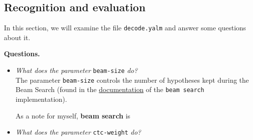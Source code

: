 \documentclass[a4paper]{article}
\def\inline{\lstinline[basicstyle=\ttfamily,keywordstyle={}]}
\begin{document}
\subsection{Recognition and evaluation}

In this section, we will examine the file \inline{decode.yalm} and answer some questions about it.

\textbf{Questions.}
\begin{itemize}
\item \emph{What does the parameter} \inline{beam-size} \emph{do?}\\

The parameter \inline{beam-size} controls the number of hypotheses kept during the Beam Search (found in the \href{https://espnet.github.io/espnet/_gen/espnet.nets.html?highlight=beam#espnet-nets-batch-beam-search}{documentation} of the \inline{beam search} implementation).

As a note for myself, \textbf{beam search} is
\item \emph{What does the parameter} \inline{ctc-weight} \emph{do?}\\
\end{itemize}


\printbibliography
\end{document}
